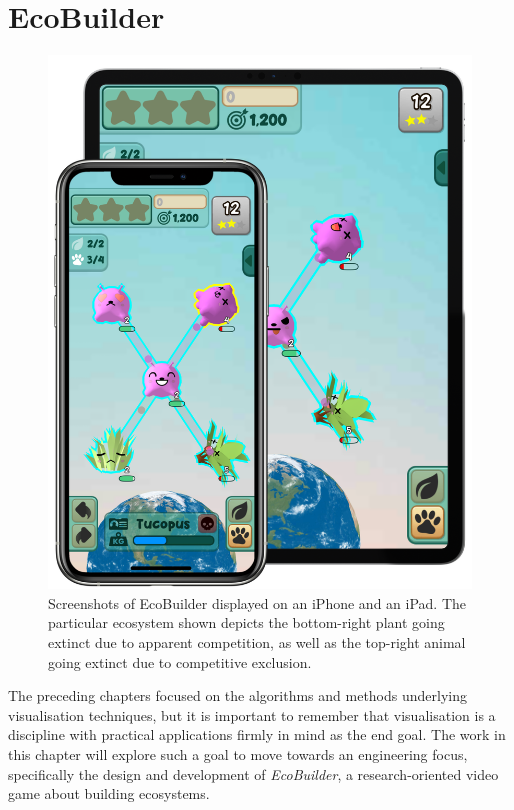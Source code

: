 \chapter{EcoBuilder}
\label{chap:joy}

\begin{figure}
    \centering
    \includegraphics[width=\textwidth]{joy/device.png}
    \caption[EcoBuilder displayed on two mobile devices.]{Screenshots of EcoBuilder displayed on an iPhone and an iPad. The particular ecosystem shown depicts the bottom-right plant going extinct due to apparent competition, as well as the top-right animal going extinct due to competitive exclusion.}
    \label{fig:ecobuilder_device}
\end{figure}

The preceding chapters focused on the algorithms and methods underlying visualisation techniques, but it is important to remember that visualisation is a discipline with practical applications firmly in mind as the end goal.
The work in this chapter will explore such a goal to move towards an engineering focus, specifically the design and development of \emph{EcoBuilder}, a research-oriented video game about building ecosystems.

